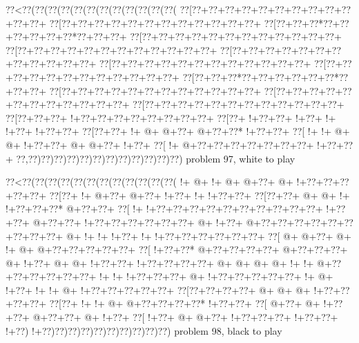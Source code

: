 \vbox{\vbox{\goo
\0??<\0??(\0??(\0??(\0??(\0??(\0??(\0??(\0??(\0??(\0??(\0??(\0??(
\0??[\0??+\0??+\0??+\0??+\0??+\0??+\0??+\0??+\0??+\0??+\0??+\0??+
\0??[\0??+\0??+\0??+\0??+\0??+\0??+\0??+\0??+\0??+\0??+\0??+\0??+
\0??[\0??+\0??+\0??*\0??+\0??+\0??+\0??+\0??+\0??*\0??+\0??+\0??+
\0??[\0??+\0??+\0??+\0??+\0??+\0??+\0??+\0??+\0??+\0??+\0??+\0??+
\0??[\0??+\0??+\0??+\0??+\0??+\0??+\0??+\0??+\0??+\0??+\0??+\0??+
\0??[\0??+\0??+\0??+\0??+\0??+\0??+\0??+\0??+\0??+\0??+\0??+\0??+
\0??[\0??+\0??+\0??+\0??+\0??+\0??+\0??+\0??+\0??+\0??+\0??+\0??+
\0??[\0??+\0??+\0??+\0??+\0??+\0??+\0??+\0??+\0??+\0??+\0??+\0??+
\0??[\0??+\0??+\0??*\0??+\0??+\0??+\0??+\0??+\0??*\0??+\0??+\0??+
\0??[\0??+\0??+\0??+\0??+\0??+\0??+\0??+\0??+\0??+\0??+\0??+\0??+
\0??[\0??+\0??+\0??+\0??+\0??+\0??+\0??+\0??+\0??+\0??+\0??+\0??+
\0??[\0??+\0??+\0??+\0??+\0??+\0??+\0??+\0??+\0??+\0??+\0??+\0??+
\0??[\0??+\0??+\0??+\- !+\0??+\0??+\0??+\0??+\0??+\0??+\0??+\0??+
\0??[\0??+\- !+\0??+\0??+\- !+\0??+\- !+\- !+\0??+\- !+\0??+\0??+
\0??[\0??+\0??+\- !+\- @+\- @+\0??+\- @+\0??+\0??*\- !+\0??+\0??+
\0??[\- !+\- !+\- @+\- @+\- !+\0??+\0??+\- @+\- @+\0??+\- !+\0??+
\0??[\- !+\- @+\0??+\0??+\0??+\0??+\0??+\0??+\0??+\- !+\0??+\0??+
\0??,\0??)\0??)\0??)\0??)\0??)\0??)\0??)\0??)\0??)\0??)\0??)\0??)
}
\hfil problem 97, white to play\hfil\break
}

\vbox{\vbox{\goo
\0??<\0??(\0??(\0??(\0??(\0??(\0??(\0??(\0??(\0??(\0??(\0??(\0??(
\- !+\- @+\- !+\- @+\- @+\0??+\- @+\- !+\0??+\0??+\0??+\0??+\0??+
\0??[\0??+\- !+\- @+\0??+\- @+\0??+\- !+\0??+\- !+\- !+\0??+\0??+
\0??[\0??+\0??+\- @+\- @+\- !+\- !+\0??+\0??+\0??*\- @+\0??+\0??+
\0??[\- !+\- !+\0??+\0??+\0??+\0??+\0??+\0??+\0??+\0??+\0??+\0??+
\- !+\0??+\0??+\- @+\0??+\0??+\- !+\0??+\0??+\0??+\0??+\0??+\0??+
\- @+\- !+\0??+\- @+\0??+\0??+\0??+\0??+\0??+\0??+\0??+\0??+\0??+
\- @+\- !+\- !+\- !+\0??+\- !+\- !+\0??+\0??+\0??+\0??+\0??+\0??+
\0??[\- @+\- @+\0??+\- @+\- !+\- @+\- @+\0??+\0??+\0??+\0??+\0??+
\0??[\- !+\0??+\0??*\- @+\0??+\0??+\0??+\0??+\- @+\0??+\0??+\0??+
\- @+\- !+\0??+\- @+\- @+\- !+\0??+\0??+\- !+\0??+\0??+\0??+\0??+
\- @+\- @+\- @+\- @+\- !+\- !+\- @+\0??+\0??+\0??+\0??+\0??+\0??+
\- !+\- !+\- !+\0??+\0??+\0??+\- @+\- !+\0??+\0??+\0??+\0??+\0??+
\- !+\- @+\- !+\0??+\- !+\- !+\- @+\- !+\0??+\0??+\0??+\0??+\0??+
\0??[\0??+\0??+\0??+\0??+\- @+\- @+\- @+\- !+\0??+\0??+\0??+\0??+
\0??[\0??+\- !+\- !+\- @+\- @+\0??+\0??+\0??+\0??*\- !+\0??+\0??+
\0??[\- @+\0??+\- @+\- !+\0??+\0??+\- @+\0??+\0??+\- @+\- !+\0??+
\0??[\- !+\0??+\- @+\- @+\0??+\- !+\0??+\0??+\0??+\- !+\0??+\0??+
\- !+\0??)\- !+\0??)\0??)\0??)\0??)\0??)\0??)\0??)\0??)\0??)\0??)
}
\hfil problem 98, black to play\hfil\break
}

